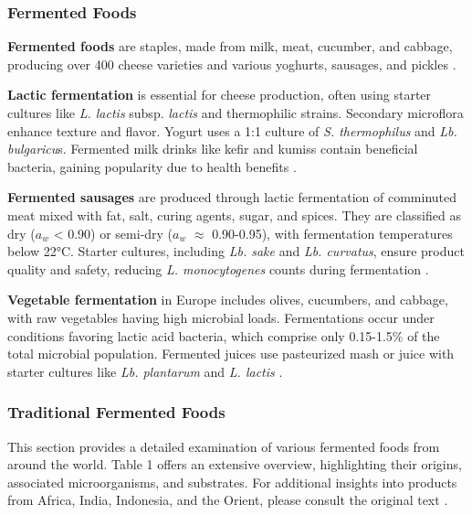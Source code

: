 \subsubsection{Fermented Foods}
\textbf{Fermented foods} are staples, made from milk, meat, cucumber, and cabbage, producing over 400 cheese varieties and various yoghurts, sausages, and pickles \cite*{L8-MicroInFood}.

\textbf{Lactic fermentation} is essential for cheese production, often using starter cultures like \textit{L. lactis} subsp. \textit{lactis} and thermophilic strains. Secondary microflora enhance texture and flavor. Yogurt uses a 1:1 culture of \textit{S. thermophilus} and \textit{Lb. bulgaricu}s. Fermented milk drinks like kefir and kumiss contain beneficial bacteria, gaining popularity due to health benefits \cite*{L8-MicroInFood}.

\textbf{Fermented sausages} are produced through lactic fermentation of comminuted meat mixed with fat, salt, curing agents, sugar, and spices. They are classified as dry ($a_w$ < 0.90) or semi-dry ($a_w$ $\approx$ 0.90-0.95), with fermentation temperatures below 22°C. Starter cultures, including \textit{Lb. sake} and \textit{Lb. curvatus}, ensure product quality and safety, reducing \textit{L. monocytogenes} counts during fermentation \cite*{L8-MicroInFood}.

\textbf{Vegetable fermentation} in Europe includes olives, cucumbers, and cabbage, with raw vegetables having high microbial loads. Fermentations occur under conditions favoring lactic acid bacteria, which comprise only 0.15-1.5\% of the total microbial population. Fermented juices use pasteurized mash or juice with starter cultures like \textit{Lb. plantarum} and \textit{L. lactis} \cite*{L8-MicroInFood}.

\subsubsection*{Traditional Fermented Foods}
This section provides a detailed examination of various fermented foods from around the world. Table 1 offers an extensive overview, highlighting their origins, associated microorganisms, and substrates. For additional insights into products from Africa, India, Indonesia, and the Orient, please consult the original text \cite*{L8-MicroInFood}.

